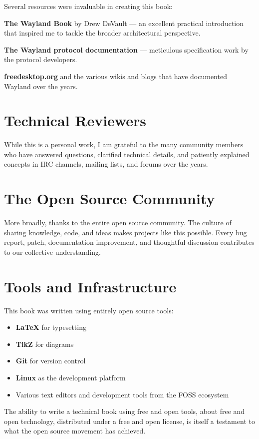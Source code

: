 Several resources were invaluable in creating this book:

\textbf{The Wayland Book} by Drew DeVault — an excellent practical introduction that inspired me to tackle the broader architectural perspective.

\textbf{The Wayland protocol documentation} — meticulous specification work by the protocol developers.

\textbf{freedesktop.org} and the various wikis and blogs that have documented Wayland over the years.

\section*{Technical Reviewers}

While this is a personal work, I am grateful to the many community members who have answered questions, clarified technical details, and patiently explained concepts in IRC channels, mailing lists, and forums over the years.

\section*{The Open Source Community}

More broadly, thanks to the entire open source community. The culture of sharing knowledge, code, and ideas makes projects like this possible. Every bug report, patch, documentation improvement, and thoughtful discussion contributes to our collective understanding.

\section*{Tools and Infrastructure}

This book was written using entirely open source tools:

\begin{itemize}
    \item \textbf{\LaTeX} for typesetting
    \item \textbf{TikZ} for diagrams
    \item \textbf{Git} for version control
    \item \textbf{Linux} as the development platform
    \item Various text editors and development tools from the FOSS ecosystem
\end{itemize}

The ability to write a technical book using free and open tools, about free and open technology, distributed under a free and open license, is itself a testament to what the open source movement has achieved.

